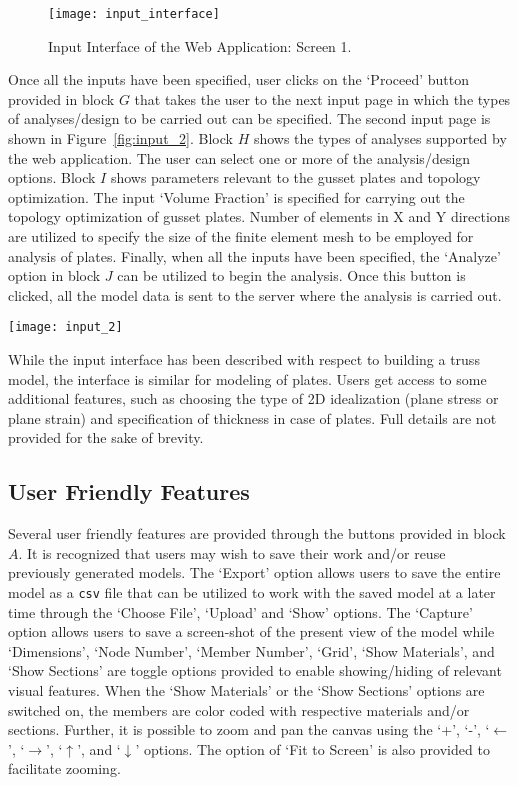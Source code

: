 \documentclass[preprint]{elsarticle}
\begin{document}
\begin{figure}[!h]
\centering
\texttt{[image: input\_interface]}
\caption{Input Interface of the Web Application: Screen 1.}
\label{fig:input}
\end{figure}


Once all the inputs have been specified, user clicks on the `Proceed' button provided in block $G$ that takes the user to the next input page in which the types of analyses/design to be carried out can be specified. The second input page is shown in Figure~\ref{fig:input_2}. Block $H$ shows the types of analyses supported by the web application. The user can select one or more of the analysis/design options. Block $I$ shows parameters relevant to the gusset plates and topology optimization. The input `Volume Fraction' is specified for carrying out the topology optimization of gusset plates. Number of elements in X and Y directions are utilized to specify the size of the finite element mesh to be employed for analysis of plates. Finally, when all the inputs have been specified, the `Analyze' option in block $J$ can be utilized to begin the analysis. Once this button is clicked, all the model data is sent to the server
where the analysis is carried out.


\begin{figure*}[!h]
\centering
\texttt{[image: input\_2]}
\caption{Input Interface of the Web Application: Screen 2.}
\label{fig:input_2}
\end{figure*}


While the input interface has been described with respect to building a truss
model, the interface is similar for modeling of plates. Users get access to some
additional features, such as choosing the type of 2D idealization (plane stress
or plane strain) and specification of thickness in case of plates. Full details are not provided for the sake of brevity.


\subsection{User Friendly Features}
Several user friendly features are provided through the buttons provided in
block $A$.
It is recognized that users may wish to save their work and/or reuse previously
generated models. The `Export' option allows users to save the entire model as a
\texttt{csv} file that can be utilized to work with the saved model at a later
time through the `Choose File', `Upload' and `Show' options. The `Capture'
option allows users to save a screen-shot of the present view of the model while
`Dimensions', `Node Number', `Member Number', `Grid', `Show Materials', and
`Show Sections' are toggle options provided to enable showing/hiding of relevant
visual features. When the `Show Materials' or the `Show Sections' options are
switched on, the members are color coded with respective materials and/or
sections. Further, it is possible to zoom and pan the canvas using the
`+', `-', `$\leftarrow$', `$\rightarrow$', `$\uparrow$', and `$\downarrow$'
options. The option of `Fit to Screen' is also provided to facilitate zooming.
\end{document}
